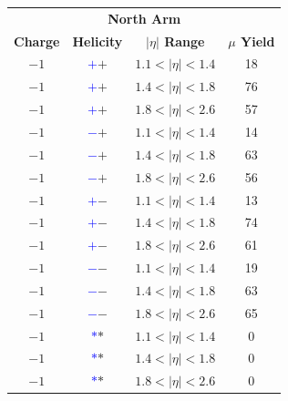 \begin{figure}
  \begin{minipage}[c]{0.67\textwidth}
    \centering
    \begin{tabular}{cccc}
      \toprule
      \multicolumn{4}{c}{\textbf{North Arm}} \\ 
      \textbf{Charge} & 
      \textbf{Helicity} & 
      \textbf{$\vert\eta\vert$ Range} &
      \textbf{$\mu$ Yield} \\ 
      \midrule
      $-1$ &\textbf{\textcolor{blue}{$+$}\textcolor{ucrgold}{$+$}} & $1.1 < \vert\eta\vert < 1.4$ & 18 \\
      $-1$ &\textbf{\textcolor{blue}{$+$}\textcolor{ucrgold}{$+$}} & $1.4 < \vert\eta\vert < 1.8$ & 76 \\
      $-1$ &\textbf{\textcolor{blue}{$+$}\textcolor{ucrgold}{$+$}} & $1.8 < \vert\eta\vert < 2.6$ & 57 \\
      $-1$ &\textbf{\textcolor{blue}{$-$}\textcolor{ucrgold}{$+$}} & $1.1 < \vert\eta\vert < 1.4$ & 14 \\
      $-1$ &\textbf{\textcolor{blue}{$-$}\textcolor{ucrgold}{$+$}} & $1.4 < \vert\eta\vert < 1.8$ & 63 \\
      $-1$ &\textbf{\textcolor{blue}{$-$}\textcolor{ucrgold}{$+$}} & $1.8 < \vert\eta\vert < 2.6$ & 56 \\
      $-1$ &\textbf{\textcolor{blue}{$+$}\textcolor{ucrgold}{$-$}} & $1.1 < \vert\eta\vert < 1.4$ & 13 \\
      $-1$ &\textbf{\textcolor{blue}{$+$}\textcolor{ucrgold}{$-$}} & $1.4 < \vert\eta\vert < 1.8$ & 74 \\
      $-1$ &\textbf{\textcolor{blue}{$+$}\textcolor{ucrgold}{$-$}} & $1.8 < \vert\eta\vert < 2.6$ & 61 \\
      $-1$ &\textbf{\textcolor{blue}{$-$}\textcolor{ucrgold}{$-$}} & $1.1 < \vert\eta\vert < 1.4$ & 19 \\
      $-1$ &\textbf{\textcolor{blue}{$-$}\textcolor{ucrgold}{$-$}} & $1.4 < \vert\eta\vert < 1.8$ & 63 \\
      $-1$ &\textbf{\textcolor{blue}{$-$}\textcolor{ucrgold}{$-$}} & $1.8 < \vert\eta\vert < 2.6$ & 65 \\
      $-1$ &\textbf{\textcolor{blue}{$*$}\textcolor{ucrgold}{$*$}} & $1.1 < \vert\eta\vert < 1.4$ & 0 \\
      $-1$ &\textbf{\textcolor{blue}{$*$}\textcolor{ucrgold}{$*$}} & $1.4 < \vert\eta\vert < 1.8$ & 0 \\
      $-1$ &\textbf{\textcolor{blue}{$*$}\textcolor{ucrgold}{$*$}} & $1.8 < \vert\eta\vert < 2.6$ & 0 \\

\end{tabular}
\end{minipage}
\end{figure}
